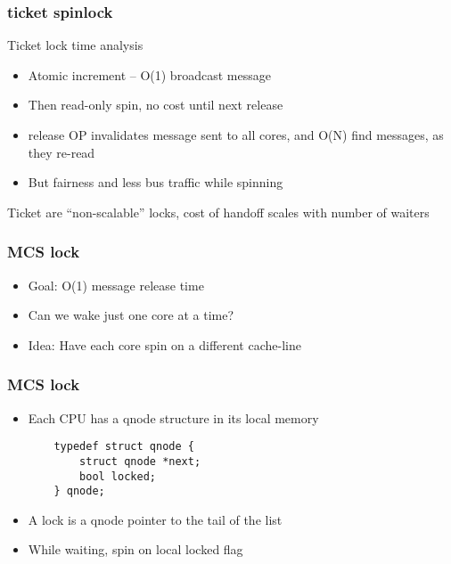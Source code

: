 \begin{frame}[fragile]
    \frametitle{ticket spinlock}
    \Large
    Ticket lock time analysis
    
    \begin{itemize}
        \item Atomic increment – O(1) broadcast message        
        \item Then read-only spin, no cost until next release             
        \item  release OP invalidates message sent to all cores, and O(N) find messages, as they re-read        
        \item  But fairness and less bus traffic while spinning
        
        
    \end{itemize}
    Ticket are “non-scalable” locks, cost of handoff scales with number of waiters
    
    
\end{frame}
\begin{frame}[fragile]
    \frametitle{MCS lock}
    \Large

    \begin{itemize}
        \item Goal: O(1) message release time
        \item Can we wake just one core at a time?
        \item  Idea: Have each core spin on a different cache-line
    \end{itemize}    
\end{frame}

\begin{frame}[fragile]
    \frametitle{MCS lock}
    \Large
    
    \begin{itemize}
        \item Each CPU has a qnode structure in its local memory

    \begin{block}{}
    \begin{verbatim}
    typedef struct qnode {
        struct qnode *next;
        bool locked;
    } qnode;
\end{verbatim}
\end{block}         
        \item  A lock is a qnode pointer to the tail of the list      
        \item While waiting, spin on local locked flag
        
    \end{itemize}    
\end{frame}

